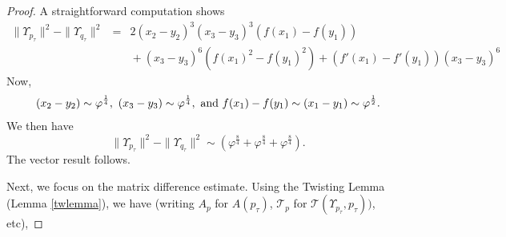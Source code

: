\documentclass[reqno]{amsart}
\begin{document}
\begin{proof}
A straightforward computation shows 
\begin{eqnarray*}
\|\Upsilon_{p_\tau}\|^2-\|\Upsilon_{q_\tau}\|^2 & = & 2(x_2-y_2)^3(x_3-y_3)^3(f(x_1)-f(y_1)) \\ 
& & \mbox{}+(x_3-y_3)^6(f(x_1)^2-f(y_1)^2)+(f'(x_1)-f'(y_1))(x_3-y_3)^6
\end{eqnarray*}
Now, \begin{equation*}
(x_2-y_2) \sim  \varphi^\frac{1}{4},\
(x_3-y_3)  \sim  \varphi^\frac{1}{4},\ \textmd{and\ }
f(x_1)-f(y_1)  \sim  (x_1-y_1)\sim\varphi^\frac{1}{2}.
\end{equation*}
We then have 
\[\|\Upsilon_{p_\tau}\|^2-\|\Upsilon_{q_\tau}\|^2\sim (\varphi^\frac{8}{4}+\varphi^\frac{8}{4}+\varphi^\frac{8}{4}).\]
The vector result follows. 

Next, we focus on the matrix difference estimate.  Using the Twisting Lemma (Lemma \ref{twlemma}), we have (writing $A_p$ for $A(p_\tau)$, $\mathcal{T}_p$ for $\mathcal{T}(\Upsilon_{p_\tau},p_\tau))$, etc),


\end{proof}
\end{document}
